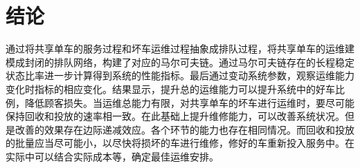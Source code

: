 \documentclass{article}
\begin{document}


\section{结论}
通过将共享单车的服务过程和坏车运维过程抽象成排队过程，将共享单车的运维建模成封闭的排队网络，构建了对应的马尔可夫链。通过马尔可夫链存在的长程稳定状态比率进一步计算得到系统的性能指标。最后通过变动系统参数，观察运维能力变化时指标的相应变化。结果显示，提升总的运维能力可以提升系统中的好车比例，降低顾客损失。当运维总能力有限，对共享单车的坏车进行运维时，要尽可能保持回收和投放的速率相一致。在此基础上提升维修能力，可以改善系统状况。但是改善的效果存在边际递减效应。各个环节的能力也存在相同情况。而回收和投放的批量应当尽可能小，以尽快将损坏的车进行维修，修好的车重新投入服务中。在实际中可以结合实际成本等，确定最佳运维安排。

\newpage


\end{document}
